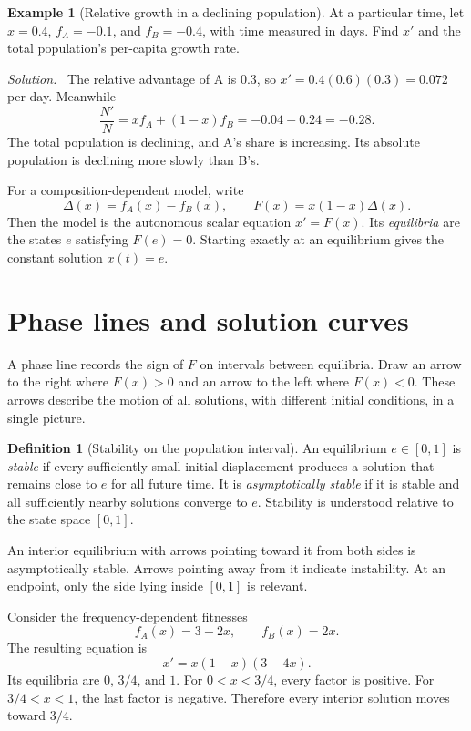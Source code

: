\documentclass[11pt,oneside,openany]{book}
\theoremstyle{definition}
\newtheorem{definition}[theorem]{Definition}
\newtheorem{example}{Example}[chapter]
\theoremstyle{remark}
\newenvironment{solution}{\par\smallskip\noindent\textit{Solution.}\ }{\par\smallskip}
\numberwithin{equation}{chapter}
\begin{document}
\begin{example}[Relative growth in a declining population]
At a particular time, let $x=0.4$, $f_A=-0.1$, and $f_B=-0.4$, with time measured in days. Find $x'$ and the total population's per-capita growth rate.
\begin{solution}
The relative advantage of A is $0.3$, so $x'=0.4(0.6)(0.3)=0.072$ per day. Meanwhile
\[
\frac{N'}{N}=xf_A+(1-x)f_B=-0.04-0.24=-0.28.
\]
The total population is declining, and A's share is increasing. Its absolute population is declining more slowly than B's.
\end{solution}
\end{example}

For a composition-dependent model, write
\[
\Delta(x)=f_A(x)-f_B(x),\qquad F(x)=x(1-x)\Delta(x).
\]
Then the model is the autonomous scalar equation $x'=F(x)$. Its \emph{equilibria} are the states $e$ satisfying $F(e)=0$. Starting exactly at an equilibrium gives the constant solution $x(t)=e$.

\section{Phase lines and solution curves}
A phase line records the sign of $F$ on intervals between equilibria. Draw an arrow to the right where $F(x)>0$ and an arrow to the left where $F(x)<0$. These arrows describe the motion of all solutions, with different initial conditions, in a single picture.

\begin{definition}[Stability on the population interval]
An equilibrium $e\in[0,1]$ is \emph{stable} if every sufficiently small initial displacement produces a solution that remains close to $e$ for all future time. It is \emph{asymptotically stable} if it is stable and all sufficiently nearby solutions converge to $e$. Stability is understood relative to the state space $[0,1]$.
\end{definition}

An interior equilibrium with arrows pointing toward it from both sides is asymptotically stable. Arrows pointing away from it indicate instability. At an endpoint, only the side lying inside $[0,1]$ is relevant.

Consider the frequency-dependent fitnesses
\[
f_A(x)=3-2x,\qquad f_B(x)=2x.
\]
The resulting equation is
\begin{equation}\label{eq:thread}
x'=x(1-x)(3-4x).
\end{equation}
Its equilibria are $0$, $3/4$, and $1$. For $0<x<3/4$, every factor is positive. For $3/4<x<1$, the last factor is negative. Therefore every interior solution moves toward $3/4$.
\end{document}
